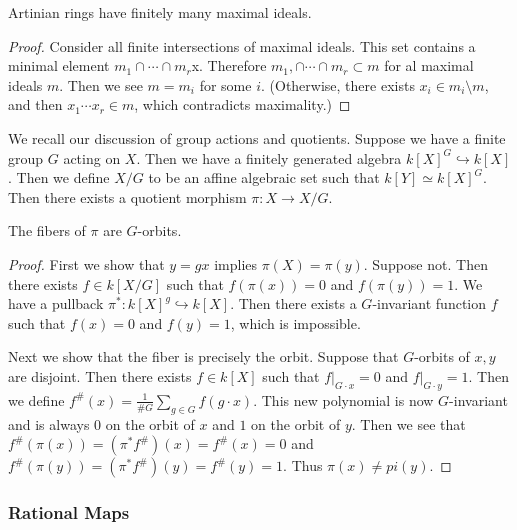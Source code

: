 \documentclass[twoside, 10pt]{article}
\begin{document}
    \begin{lem} Artinian rings have finitely many maximal ideals.
        \begin{proof} Consider all finite intersections of maximal ideals. This
            set contains a minimal element $m_1 \cap \cdots \cap m_r$x.
            Therefore $m_1, \cap \cdots \cap m_r \subset m$ for al maximal
            ideals $m$.  Then we see $m = m_i$ for some $i$. (Otherwise, there
        exists $x_i \in m_i \setminus m$, and then $x_1\cdots x_r \in m$, which
    contradicts maximality.) \end{proof} \end{lem}

    We recall our discussion of group actions and quotients. Suppose we have a
    finite group $G$ acting on $X$. Then we have a finitely generated algebra
    $k[X]^G \hookrightarrow k[X]$. Then we define $X/G$ to be an affine
    algebraic set such that $k[Y] \simeq k[X]^G$. Then there exists a quotient
    morphism $\pi: X \rightarrow X/G$.

    \begin{prop} The fibers of $\pi$ are $G$-orbits.  \begin{proof} First we
        show that $y = gx$ implies $\pi(X) = \pi(y)$. Suppose not.  Then there
        exists $f \in k[X/G]$ such that $f(\pi(x)) = 0$ and $f(\pi(y)) = 1$. We
        have a pullback $\pi^*: k[X]^g \hookrightarrow k[X]$. Then there exists
        a $G$-invariant function $f$ such that $f(x) = 0$ and $f(y) = 1$, which
        is impossible.

            Next we show that the fiber is precisely the orbit. Suppose that
            $G$-orbits of $x,y$ are disjoint. Then there exists $f \in k[X]$
            such that $f \vert_{G \cdot x} = 0$ and $f \vert_{G \cdot y} = 1$.
            Then we define $f^\#(x) = \frac{1}{\#G} \sum_{g \in G} f(g \cdot
            x)$. This new polynomial is now $G$-invariant and is always $0$ on
            the orbit of $x$ and $1$ on the orbit of $y$. Then we see that
            $f^{\#}(\pi(x)) = (\pi^*f^{\#})(x) = f^{\#}(x) = 0$ and
        $f^{\#}(\pi(y)) = (\pi^*f^{\#})(y) = f^{\#}(y) = 1$. Thus $\pi(x) \neq
    pi(y)$.  \end{proof} \end{prop}

    \subsubsection{Rational Maps}
\end{document}
